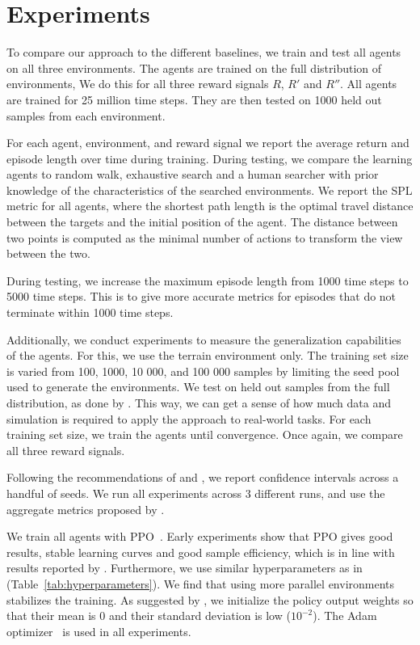 \section{Experiments}
\label{sec:experiments}

To compare our approach to the different baselines,
we train and test all agents on all three environments.
The agents are trained on the full distribution of environments,
We do this for all three reward signals \(R\), \(R'\) and \(R''\).
All agents are trained for 25 million time steps.
They are then tested on 1000 held out samples from each environment.

For each agent, environment, and reward signal we report the average return and episode length over time during training.
During testing, we compare the learning agents to random walk, exhaustive search and a human searcher with prior knowledge of the characteristics of the searched environments.
We report the SPL metric for all agents, where the shortest path length is the optimal travel distance between the targets and the initial position of the agent.
The distance between two points is computed as the minimal number of actions to transform the view between the two.

During testing, we increase the maximum episode length from 1000 time steps to 5000 time steps.
This is to give more accurate metrics for episodes that do not terminate within 1000 time steps. 

Additionally, we conduct experiments to measure the generalization capabilities of the agents.
For this, we use the terrain environment only.
The training set size is varied from 100, 1000, 10 000, and 100 000 samples by limiting the seed pool used to generate the environments.
We test on held out samples from the full distribution, as done by \cite{cobbe_procgen_2020}.
This way, we can get a sense of how much data and simulation is required to apply the approach to real-world tasks.
For each training set size, we train the agents until convergence.
Once again, we compare all three reward signals.

Following the recommendations of \cite{henderson_matters_2018} and \cite{agarwal_rlliable_2022}, we report confidence intervals across a handful of seeds.
We run all experiments across 3 different runs, and use the aggregate metrics proposed by \cite{agarwal_rlliable_2022}.

We train all agents with PPO~\cite{schulman_ppo_2017}.
Early experiments show that PPO gives good results, stable learning curves and good sample efficiency, which is in line with results reported by \cite{andrychowicz_empirical_2020}.
Furthermore, we use similar hyperparameters as in \cite{cobbe_procgen_2020} (Table~\ref{tab:hyperparameters}).
We find that using more parallel environments stabilizes the training.
As suggested by \cite{andrychowicz_empirical_2020}, we initialize the policy output weights so that their mean is 0 and their standard deviation is low (\(10^{-2}\)).
The Adam optimizer~\cite{kingma_ba_2017} is used in all experiments.


